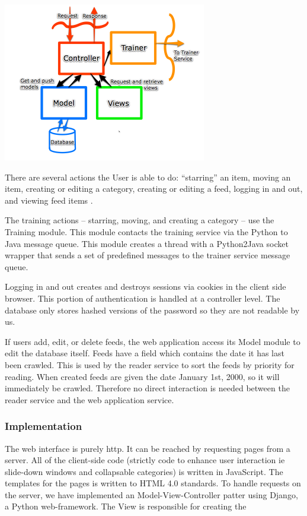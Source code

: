 \documentclass[letterpaper]{article}
\begin{document}
\noindent\includegraphics[width=3.5in]{MVC.png}

There are several actions the User is able to do: ``starring'' an item, moving an item, creating or editing a category, creating or editing a feed, logging in and out, and viewing feed items . 

The training actions -- starring, moving, and creating a category -- use the Training module. This module contacts the training service via the Python to Java message queue. This module creates a thread with a Python2Java socket wrapper that sends a set of predefined messages to the trainer service message queue. 

Logging in and out creates and destroys sessions via cookies in the client side browser. This portion of authentication is handled at a controller level. The database only stores hashed versions of the password so they are not readable by us. 

If users add, edit, or delete feeds, the web application access its Model module to edit the database itself.  Feeds have a field which contains the date it has last been crawled.  This is used by the reader service to sort the feeds by priority for reading.  When created feeds are given the date January 1st, 2000, so it will immediately be crawled.  Therefore no direct interaction is needed between the reader service and the web application service.

\subsubsection{Implementation}
The web interface is purely http.  It can be reached by requesting pages from a server.  All of the client-side code (strictly code to enhance user interaction ie slide-down windows and collapsable categories) is written in JavaScript. The templates for the pages is written to HTML 4.0 standards. To handle requests on the server, we have implemented an Model-View-Controller patter using Django, a Python web-framework.  The View is responsible for creating the 
\end{document}
